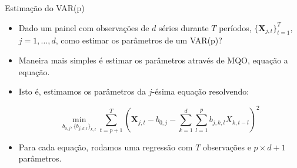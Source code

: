 \documentclass[11pt]{beamer}
\begin{document}
\begin{frame}{Estimação do VAR(p)}
	\begin{itemize}
		\item 	Dado um painel com observações de $d$ séries durante $T$ períodos, $\{\boldsymbol{X}_{j,t}\}_{t=1}^T$, $j=1,\ldots, d$, como estimar os parâmetros de um VAR(p)?
		\item Maneira mais simples é estimar os parâmetros através de MQO, {\color{blue}equação a equação}.
		\item Isto é, estimamos os parâmetros da $j$-ésima equação resolvendo:
		
		$$\min_{b_{0,j}, \{b_{j,k,l}\}_{k,l}} \sum_{t=p+1}^T\left(\boldsymbol{X}_{j,t} - b_{0,j} - \sum_{k=1}^d \sum_{l=1}^p b_{j,k,l}X_{k,t-l}\right)^2$$
		\item Para cada equação, rodamos uma regressão com $T$ observações e $p\times d +1$ parâmetros.
	\end{itemize}

\end{frame}
\end{document}
